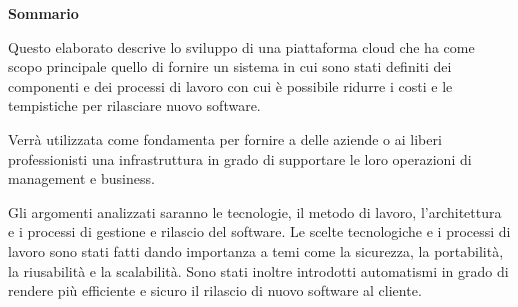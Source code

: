 \begin{center}
    \textbf{Sommario}
\end{center}
{\itshape{
    Questo elaborato descrive lo sviluppo di una piattaforma cloud che ha come scopo principale quello di fornire un sistema in cui sono stati definiti
    dei componenti e dei processi di lavoro con cui è possibile ridurre i costi e le tempistiche per rilasciare nuovo software.

    Verrà utilizzata come fondamenta per fornire a delle aziende o ai liberi
    professionisti una infrastruttura in grado di supportare le loro operazioni di management e business.

    Gli argomenti analizzati saranno le tecnologie, il metodo di lavoro, l'architettura e i processi di gestione e rilascio del software.
    Le scelte tecnologiche e i processi di lavoro sono stati fatti dando importanza a temi come la sicurezza, la portabilità, la riusabilità e la scalabilità.
    Sono stati inoltre introdotti automatismi in grado di rendere più efficiente e sicuro il rilascio di nuovo software al cliente.
}}